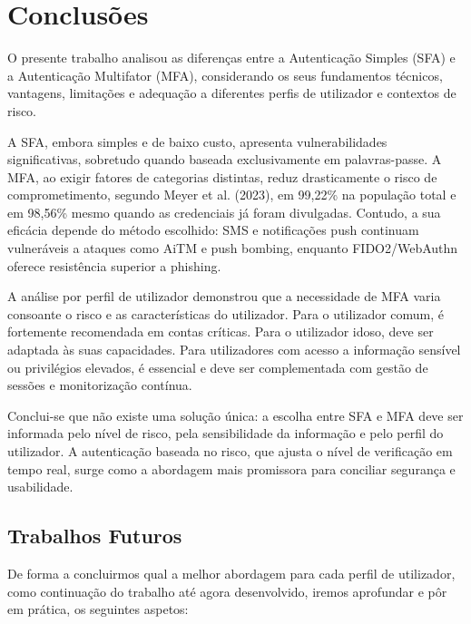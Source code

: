 \section{Conclusões}

\hspace{1cm} O presente trabalho analisou as diferenças entre a Autenticação Simples (SFA) e a Autenticação Multifator (MFA), considerando os seus fundamentos técnicos, vantagens, limitações e adequação a diferentes perfis de utilizador e contextos de risco.

\hspace{1cm} A SFA, embora simples e de baixo custo, apresenta vulnerabilidades significativas, sobretudo quando baseada exclusivamente em palavras-passe. A MFA, ao exigir fatores de categorias distintas, reduz drasticamente o risco de comprometimento, segundo Meyer et al. (2023), em 99,22\% na população total e em 98,56\% mesmo quando as credenciais já foram divulgadas. Contudo, a sua eficácia depende do método escolhido: SMS e notificações push continuam vulneráveis a ataques como AiTM e push bombing, enquanto FIDO2/WebAuthn oferece resistência superior a phishing.

\hspace{1cm} A análise por perfil de utilizador demonstrou que a necessidade de MFA varia consoante o risco e as características do utilizador. Para o utilizador comum, é fortemente recomendada em contas críticas. Para o utilizador idoso, deve ser adaptada às suas capacidades. Para utilizadores com acesso a informação sensível ou privilégios elevados, é essencial e deve ser complementada com gestão de sessões e monitorização contínua.

\hspace{1cm} Conclui-se que não existe uma solução única: a escolha entre SFA e MFA deve ser informada pelo nível de risco, pela sensibilidade da informação e pelo perfil do utilizador. A autenticação baseada no risco, que ajusta o nível de verificação em tempo real, surge como a abordagem mais promissora para conciliar segurança e usabilidade.

\subsection{Trabalhos Futuros}

\hspace{1cm} De forma a concluirmos qual a melhor abordagem para cada perfil de utilizador, como continuação do trabalho até agora desenvolvido, iremos aprofundar e pôr em prática, os seguintes aspetos:

